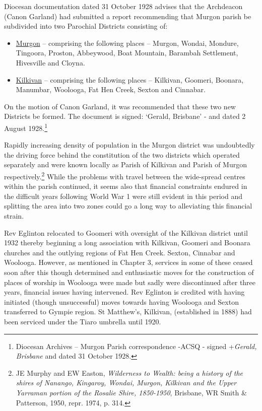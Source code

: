 Diocesan documentation dated 31 October 1928 advises that the Archdeacon
(Canon Garland) had submitted a report recommending that Murgon parish
be subdivided into two Parochial Districts consisting of:

\begin{itemize}
\item
  \underline{Murgon} -- comprising the following places -- Murgon,
  Wondai, Mondure, Tingoora, Proston, Abbeywood, Boat Mountain, Barambah
  Settlement, Hivesville and Cloyna.
\item
  \underline{Kilkivan} -- comprising the following places -- Kilkivan,
  Goomeri, Boonara, Manumbar, Woolooga, Fat Hen Creek, Sexton and
  Cinnabar.
\end{itemize}

On the motion of Canon Garland, it was recommended that these two new
Districts be formed. The document is signed: `Gerald, Brisbane' - and
dated 2 August 1928.\footnote{Diocesan Archives -- Murgon Parish
  correspondence -ACSQ - signed +\emph{Gerald, Brisbane} and dated 31
  October 1928.}

Rapidly increasing density of population in the Murgon district was
undoubtedly the driving force behind the constitution of the two
districts which operated separately and were known locally as Parish of
Kilkivan and Parish of Murgon respectively.\footnote{JE Murphy and EW
  Easton, \emph{Wilderness to Wealth: being a history of the shires of
  Nanango, Kingaroy, Wondai, Murgon, Kilkivan and the Upper Yarraman
  portion of the Rosalie Shire, 1850-1950}, Brisbane, WR Smith \&
  Patterson, 1950, repr. 1974, p. 314.} While the problems with travel
between the wide-spread centres within the parish continued, it seems
also that financial constraints endured in the difficult years following
World War 1 were still evident in this period and splitting the area
into two zones could go a long way to alleviating this financial strain.

Rev Eglinton relocated to Goomeri with oversight of the Kilkivan
district until 1932 thereby beginning a long association with Kilkivan,
Goomeri and Boonara churches and the outlying regions of Fat Hen Creek.
Sexton, Cinnabar and Woolooga. However, as mentioned in Chapter 3,
services in some of these ceased soon after this though determined and
enthusiastic moves for the construction of places of worship in Woolooga
were made but sadly were discontinued after three years, financial
issues having intervened. Rev Eglinton is credited with having initiated
(though unsuccessful) moves towards having Woolooga and Sexton
transferred to Gympie region. St Matthew's, Kilkivan, (established in
1888) had been serviced under the Tiaro umbrella until 1920.

